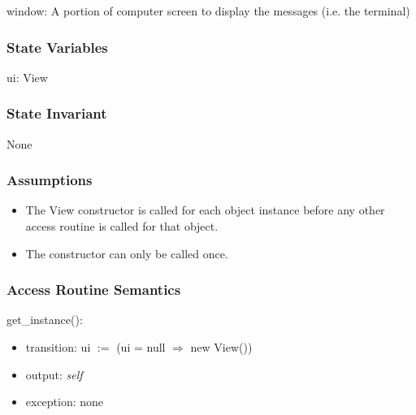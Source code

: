 \documentclass[12pt]{article}
\begin{document}
window: A portion of computer screen to display the messages (i.e. the terminal)

\subsubsection* {State Variables}

ui: View

\subsubsection* {State Invariant}

None

\subsubsection* {Assumptions}

\begin{itemize}
  \item The View constructor is called for each object instance before any 
  other access routine is called for that object.  
  \item The constructor can only be called once.
\end{itemize}

\subsubsection* {Access Routine Semantics}

\noindent get\_instance():
\begin{itemize}
\item transition: ui $:=$ (ui = null $\Rightarrow$ new View())
\item output: \textit{self}
\item exception: none
\end{itemize}


\end{document}
